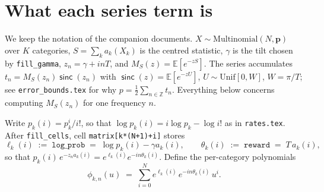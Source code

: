 \documentclass[11pt]{article}
\newcommand{\sinck}{\operatorname{\mathsf{sinc}}}
\begin{document}
\begin{abstract}
The same idea -- drop the constraint, work with independent categories -- is already used
elsewhere in this codebase to select the tilt $\gamma$ itself, and we derive that construction in
full: the Poissonized log-MGF is convex in $\gamma$, its derivatives come out of the same
one-pass moment computation the tilt $\nu$ is already solved for by an application of the envelope
theorem, and a safeguarded Newton iteration replaces a 128-point grid at $13$--$25\times$ less time
per instance. We explain why the same \emph{approximate} (never de-Poissonized) construction that
is exact enough for $\gamma$ is not accurate enough for the series terms themselves. Three further,
evaluator-independent changes round out the implementation: a persistent thread pool replaces
per-chunk thread creation in \texttt{series()} ($2\times$ at the smallest instances); the adaptive
stopping rule for \texttt{extrapolate}$\,\ge2$ combines the pre-existing term-ratio rule with a
check on a shallow, median-smoothed extrapolation's trailing-window stability, verified stable to
$10^{-9}$--$10^{-13}$ under a one-ulp perturbation of every term, across both evaluators and all
thread counts tried; and locating the statistic's range before the series can run -- previously an
$O(KN^2)$ dynamic program -- is now $O(K)$ for the power-divergence family (an exact vertex
argument for the minimum, a closed-form bound for the maximum) and $O(K\log K)$ for the
probability-mass statistic (an exact maximum via \citet{whitehendy2010}'s multinomial-mode
algorithm), cutting setup time by up to $4$--$5\times$ at $N=10^4$.
\end{abstract}

\tableofcontents

\section{What each series term is}
\label{sec:setup}

We keep the notation of the companion documents. $X\sim\mathrm{Multinomial}(N,\mathbf p)$ over $K$
categories, $S=\sum_k a_k(X_k)$ is the centred statistic, $\gamma$ is the tilt chosen by
\texttt{fill\_gamma}, $z_n=\gamma+inT$, and $M_S(z)=\mathbb E[e^{-zS}]$. The series accumulates
$t_n=M_S(z_n)\sinck(z_n)$ with $\sinck(z)=\mathbb E[e^{-zU}]$, $U\sim\mathrm{Unif}[0,W]$, $W=\pi/T$;
see \texttt{error\_bounds.tex} for why $p=\tfrac12\sum_{n\in\mathbb Z}t_n$. Everything below concerns
computing $M_S(z_n)$ for one frequency $n$.

Write $p_k(i)=p_k^i/i!$, so that $\log p_k(i)=i\log p_k-\log i!$ as in \texttt{rates.tex}. After
\texttt{fill\_cells}, cell \texttt{matrix[k*(N+1)+i]} stores
\[
  \ell_k(i)\;:=\;\texttt{log\_prob}\;=\;\log p_k(i)-\gamma a_k(i),
  \qquad
  \theta_k(i)\;:=\;\texttt{reward}\;=\;T\,a_k(i),
\]
so that $p_k(i)\,e^{-z_na_k(i)}=e^{\ell_k(i)}e^{-in\theta_k(i)}$. Define the per-category polynomials
\[
  \phi_{k,n}(u)\;=\;\sum_{i=0}^{N}e^{\ell_k(i)}\,e^{-in\theta_k(i)}\,u^i .
\]
\end{document}
